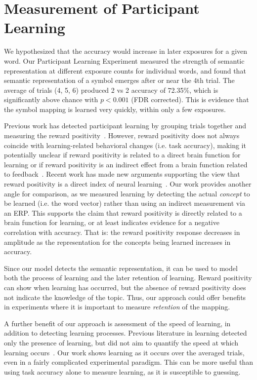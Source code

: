 
\section{Measurement of Participant Learning}
We hypothesized that the \tvt accuracy would increase in later exposures for a given word. Our Participant Learning Experiment measured the strength of semantic representation at different exposure counts for individual words, and found that semantic representation of a symbol emerges after or near the 4th trial. The average of trials (4, 5, 6) produced 2 vs 2 accuracy of 72.35\%, which is significantly above chance with $p < 0.001$ (FDR corrected). This is evidence that the symbol mapping is learned very quickly, within only a few exposures. 

Previous work has detected participant learning by grouping trials together and measuring the reward positivity~\cite{krigolson2014we}. However, reward positivity does not always coincide with learning-related behavioral changes (i.e. task accuracy), making it potentially unclear if reward positivity is related to a direct brain function for learning or if reward positivity is an indirect effect from a brain function related to feedback~\cite{walsh2012learning}. Recent work has made new arguments supporting the view that reward positivity is a direct index of neural learning~\cite{williams2017application}. Our work provides another angle for comparison, as we measured learning by detecting the actual \emph{concept} to be learned (i.e. the word vector) rather than using an indirect measurement via an ERP. This supports the claim that reward positivity is directly related to a brain function for learning, or at least indicates evidence for a negative correlation with \tvt accuracy. That is: the reward positivity response decreases in amplitude as the representation for the concepts being learned increases in \tvt accuracy.

Since our model detects the semantic representation, it can be used to model both the process of learning and the later retention of learning. Reward positivity can show when learning has occurred, but the absence of reward positivity does not indicate the knowledge of the topic. Thus, our approach could offer benefits in experiments where it is important to measure \emph{retention} of the mapping. %

A further benefit of our approach is assessment of the speed of learning, in addition to detecting learning processes. Previous literature in learning detected only the presence of learning, but did not aim to quantify the speed at which learning occurs~\cite{krigolson2014we}. Our work shows learning as it occurs over the averaged trials, even in a fairly complicated experimental paradigm. This can be more useful than using task accuracy alone to measure learning, as it is susceptible to guessing.
